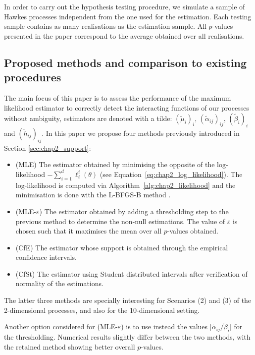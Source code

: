     In order to carry out the hypothesis testing procedure, we simulate a sample of Hawkes processes independent from the one used for the estimation. Each testing sample contains as many realisations as the estimation sample. All $p$-values presented in the paper correspond to the average obtained over all realisations.

    \subsection{Proposed methods and comparison to existing procedures}
    \label{sec:chap2_description_methods}
    The main focus of this paper is to assess the performance of the maximum likelihood estimator to correctly detect the interacting functions of our processes without ambiguity, estimators are denoted with a tilde: $(\tilde\mu_i)_i$, $(\tilde\alpha_{ij})_{ij}$, $(\tilde\beta_i)_i$ and \((\tilde h_{ij})_{ij}\).
    In this paper we propose four methods previously introduced in Section \ref{sec:chap2_support}:
    \begin{itemize}
        \item (MLE) The estimator obtained by minimising the opposite of the log-likelihood $-\sum_{i=1}^{d}{\ell_t^i(\theta)}$ (see Equation~\eqref{eq:chap2_log_likelihood}). The log-likelihood is computed via Algorithm~\ref{alg:chap2_likelihood} and the minimisation is done with the L-BFGS-B method \parencite{Byrd1995}.
        \item (MLE-$\varepsilon$) The estimator obtained by adding a thresholding step to the previous method to determine the non-null estimations.  The value of $\varepsilon$ is chosen such that it maximises the mean over all $p$-values obtained.
        \item (CfE) The estimator whose support is obtained through the empirical confidence intervals.
        \item (CfSt) The estimator using Student distributed intervals after verification of normality of the estimations.
    \end{itemize}

    The latter three methods are specially interesting for Scenarios (2) and (3) of the 2-dimensional processes, and also for the 10-dimensional setting.

    \begin{remark}
    Another option considered for (MLE-$\varepsilon$) is to use instead the values $\lvert\tilde \alpha_{ij} / \tilde \beta_{i}\rvert$ for the thresholding. Numerical results slightly differ between the two methods, with the retained method showing better overall $p$-values.
    \end{remark}

